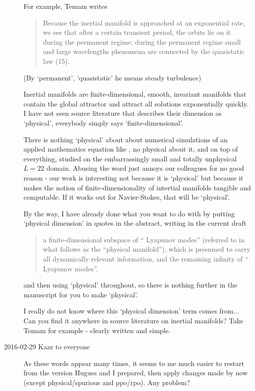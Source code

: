 \begin{description}
For example, Temam writes

\begin{quote}
Because the inertial manifold is approached at an exponential rate,
we see that after a certain transient period, the orbits lie on it during
the permanent regime: during the permanent regime small and large
wavelengths phenomena are connected by the quasistatic law (15).
\end{quote}

(By `permanent', `quasistatic' he means steady turbulence)

Inertial manifolds are finite-dimensional, smooth, invariant manifolds
that contain the global attractor and attract all solutions exponentially
quickly. I have not seen source literature that describes their dimension
as `physical', everybody simply says `finite-dimensional'.

There is nothing `physical' about about numerical simulations of an
applied mathematics equation like \KS, no physical about it, and on top
of everything, studied on the embarrassingly small and totally unphysical
$L=22$ domain. Abusing the word just annoys our colleagues for no good
reason - our work is interesting not because it is `physical' but because
it makes the notion of finite-dimensionality of intertial manifolds
tangible and computable. If it works out for Navier-Stokes, that will be
`physical'.

By the way, I have already done what you want to do with by putting
`physical dimension' in quotes in the abstract, writing in the current
draft

\begin{quote}
a finite-dimensional subspace of
``{\entangled} Lyapunov modes'' (referred to in what follows as the
``physical manifold''), which is presumed to carry all dynamically
relevant information, and the remaining infinity of ``{\transient}
Lyapunov modes''.
\end{quote}

and then using `physical' throughout, so there is nothing further in the
manuscript for you to make `physical'.

I really  do not know where this `physical dimension' term comes from...
Can you find it anywhere in source literature on inertial manifolds? Take
Temam for example - clearly written and simple.

\item[2016-02-29 Kazz to everyone]
As these words appear many times, it seems to me much easier to
restart from the version Hugues and I prepared, then apply changes made
by now (except physical/spurious and ppo/rpo). Any problem?


\end{description}

